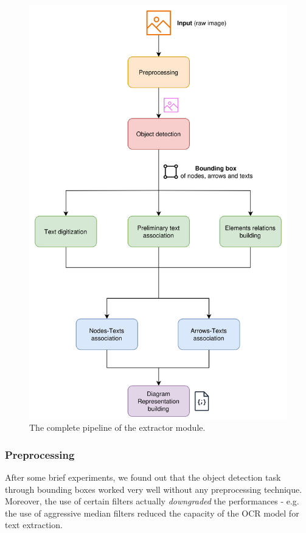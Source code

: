 \documentclass[conference]{IEEEtran}
\begin{document}
\begin{figure}
	\centering
	\includegraphics[width=\linewidth]{flowchart-extractor.png}
	\caption{The complete pipeline of the extractor module.}
	\label{fig:flowchart-extractor}
\end{figure}

\subsubsection{Preprocessing}
After some brief experiments, we found out that the object detection task through bounding boxes worked very well without any preprocessing technique. Moreover, the use of certain filters actually \textit{downgraded} the performances - e.g. the use of aggressive median filters reduced the capacity of the OCR model for text extraction.
\end{document}
